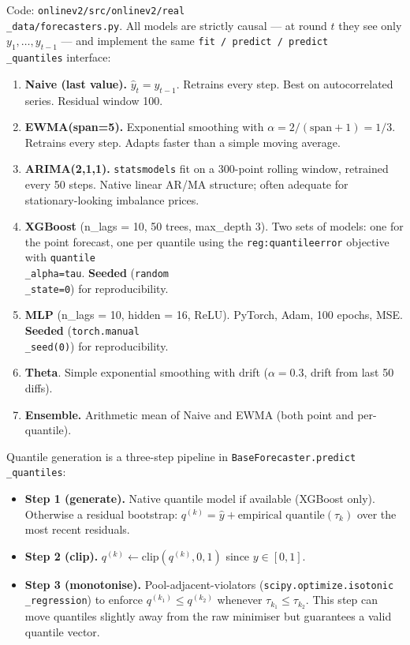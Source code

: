 \documentclass[11pt]{article}
\begin{document}
Code: \texttt{onlinev2/src/onlinev2/real\\_data/forecasters.py}. All models are strictly causal --- at round $t$ they see only $y_1, \dots, y_{t-1}$ --- and implement the same \texttt{fit / predict / predict\\_quantiles} interface:

\begin{enumerate}
\item \textbf{Naive (last value).} $\hat y_t = y_{t-1}$. Retrains every step. Best on autocorrelated series. Residual window 100.
\item \textbf{EWMA(span=5).} Exponential smoothing with $\alpha = 2/(\text{span}+1) = 1/3$. Retrains every step. Adapts faster than a simple moving average.
\item \textbf{ARIMA(2,1,1).} \texttt{statsmodels} fit on a 300-point rolling window, retrained every 50 steps. Native linear AR/MA structure; often adequate for stationary-looking imbalance prices.
\item \textbf{XGBoost} (n\_lags = 10, 50 trees, max\_depth 3). Two sets of models: one for the point forecast, one per quantile using the \texttt{reg:quantileerror} objective with \texttt{quantile\\_alpha=tau}. \textbf{Seeded} (\texttt{random\\_state=0}) for reproducibility.
\item \textbf{MLP} (n\_lags = 10, hidden = 16, ReLU). PyTorch, Adam, 100 epochs, MSE. \textbf{Seeded} (\texttt{torch.manual\\_seed(0)}) for reproducibility.
\item \textbf{Theta}. Simple exponential smoothing with drift ($\alpha = 0.3$, drift from last 50 diffs).
\item \textbf{Ensemble.} Arithmetic mean of Naive and EWMA (both point and per-quantile).
\end{enumerate}

Quantile generation is a three-step pipeline in \texttt{BaseForecaster.predict\\_quantiles}:

\begin{itemize}
\item \textbf{Step 1 (generate).} Native quantile model if available (XGBoost only). Otherwise a residual bootstrap: $q^{(k)} = \hat y + \text{empirical quantile}(\tau_k)$ over the most recent residuals.
\item \textbf{Step 2 (clip).} $q^{(k)} \leftarrow \text{clip}(q^{(k)}, 0, 1)$ since $y \in [0,1]$.
\item \textbf{Step 3 (monotonise).} Pool-adjacent-violators (\texttt{scipy.optimize.isotonic\\_regression}) to enforce $q^{(k_1)} \le q^{(k_2)}$ whenever $\tau_{k_1} \le \tau_{k_2}$. This step can move quantiles slightly away from the raw minimiser but guarantees a valid quantile vector.
\end{itemize}
\end{document}
